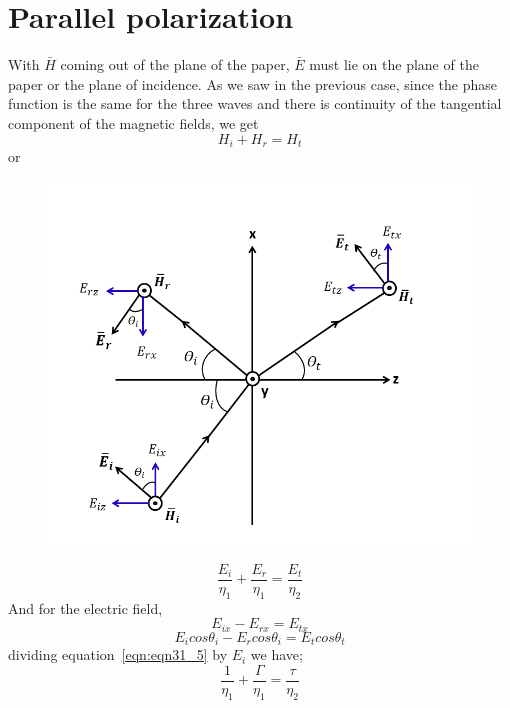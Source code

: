\section{Parallel polarization}
With $\bar{H}$ coming out of the plane of the paper, $\bar{E}$ must lie on the plane of the paper or the plane of incidence. As we saw in the previous case, since the phase function is the same for the three waves and there is continuity of the tangential component of the magnetic fields, we get
\begin{equation*}
H_{i} + H_{r} = H_{t}
\end{equation*}
or
\begin{figure}[h]
\centering
\includegraphics[width=1.2\linewidth]{./graphics/parallel_polarization1}
\caption{}
\label{fig:15}
\end{figure}
\begin{equation}
\frac{E_{i}}{\eta_{1}} + \frac{E_{r}}{\eta_{1}} = \frac{E_{t}}{\eta_{2}}
\label{eqn:eqn31_5}
\end{equation}
And for the electric field,
\begin{equation*}
E_{ix} - E_{rx} = E_{tx}
\end{equation*}
\begin{equation}
E_{i} cos\theta_{i} - E_{r} cos\theta_{i} = E_{t} cos\theta_{t}
\label{eqn:eqn31_6}
\end{equation}
dividing equation~\ref{eqn:eqn31_5} by $E_{i}$ we have;
\begin{equation}
\frac{1}{\eta_{1}} + \frac{\Gamma}{\eta_{1}} = \frac{\tau}{\eta_{2}}
\label{eqn:eqn31_7}
\end{equation}
